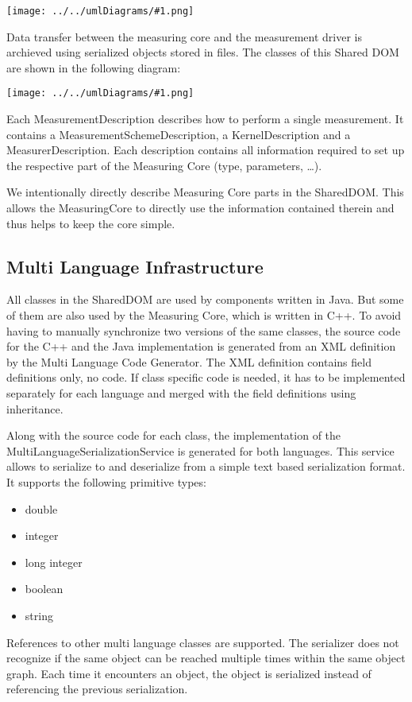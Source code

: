 \documentclass[a4paper,12pt]{article}
\newcommand{\umlDiagram}[1]{\begin{center}\texttt{[image: ../../umlDiagrams/\#1.png]}\end{center}}
\begin{document}
\umlDiagram{ToolComponents}

Data transfer between the measuring core and the measurement driver is archieved using serialized objects stored in files. The classes of this Shared DOM are shown in the following diagram:

\umlDiagram{MultiLanguageClasses}

Each MeasurementDescription describes how to perform a single measurement. It contains a MeasurementSchemeDescription, a KernelDescription and a MeasurerDescription. Each description contains all information required to set up the respective part of the Measuring Core (type, parameters, \ldots).

We intentionally directly describe Measuring Core parts in the SharedDOM. This allows the MeasuringCore to directly use the information contained therein and thus helps to keep the core simple.

\subsection{Multi Language Infrastructure}
All classes in the SharedDOM are used by components written in Java. But some of them are also used by the Measuring Core, which is written in C++. To avoid having to manually synchronize two versions of the same classes, the source code for the C++ and the Java implementation is generated from an XML definition by the Multi Language Code Generator. The XML definition contains field definitions only, no code. If class specific code is needed, it has to be implemented separately for each language and merged with the field definitions using inheritance.

Along with the source code for each class, the implementation of the MultiLanguageSerializationService is generated for both languages. This service allows to serialize to and deserialize from a simple text based serialization format. It supports the following primitive types:
\begin{itemize}
\item double
\item integer
\item long integer
\item boolean
\item string
\end{itemize}

References to other multi language classes are supported. The serializer does not recognize if the same object can be reached multiple times within the same object graph. Each time it encounters an object, the object is serialized instead of referencing the previous serialization.
\end{document}
